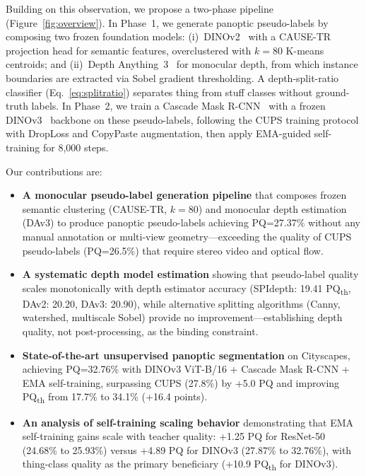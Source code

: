 \documentclass{bmvc2k}
\newcommand{\pqt}{PQ\textsubscript{th}\xspace}
\begin{document}
Building on this observation, we propose a two-phase pipeline (Figure~\ref{fig:overview}). In Phase~1, we generate panoptic pseudo-labels by composing two frozen foundation models: (i)~DINOv2~\cite{oquab2024dinov2} with a CAUSE-TR~\cite{kim2025cause} projection head for semantic features, overclustered with $k{=}80$ K-means centroids; and (ii)~Depth Anything~3~\cite{lin2025da3} for monocular depth, from which instance boundaries are extracted via Sobel gradient thresholding. A depth-split-ratio classifier (Eq.~\ref{eq:splitratio}) separates thing from stuff classes without ground-truth labels. In Phase~2, we train a Cascade Mask R-CNN~\cite{cai2021cascade} with a frozen DINOv3~\cite{fang2025dinov3} backbone on these pseudo-labels, following the CUPS training protocol with DropLoss and CopyPaste augmentation, then apply EMA-guided self-training for 8,000 steps.

Our contributions are:
\begin{itemize}
\item \textbf{A monocular pseudo-label generation pipeline} that composes frozen semantic clustering (CAUSE-TR, $k{=}80$) and monocular depth estimation (DAv3) to produce panoptic pseudo-labels achieving PQ=27.37\% without any manual annotation or multi-view geometry---exceeding the quality of CUPS pseudo-labels (PQ=26.5\%) that require stereo video and optical flow.

\item \textbf{A systematic depth model estimation} showing that pseudo-label quality scales monotonically with depth estimator accuracy (SPIdepth: 19.41 \pqt, DAv2: 20.20, DAv3: 20.90), while alternative splitting algorithms (Canny, watershed, multiscale Sobel) provide no improvement---establishing depth quality, not post-processing, as the binding constraint.

\item \textbf{State-of-the-art unsupervised panoptic segmentation} on Cityscapes, achieving PQ=32.76\% with DINOv3 ViT-B/16 + Cascade Mask R-CNN + EMA self-training, surpassing CUPS (27.8\%) by +5.0 PQ and improving \pqt from 17.7\% to 34.1\% (+16.4 points).

\item \textbf{An analysis of self-training scaling behavior} demonstrating that EMA self-training gains scale with teacher quality: +1.25 PQ for ResNet-50 (24.68\% to 25.93\%) versus +4.89 PQ for DINOv3 (27.87\% to 32.76\%), with thing-class quality as the primary beneficiary (+10.9 \pqt for DINOv3).
\end{itemize}
\end{document}
